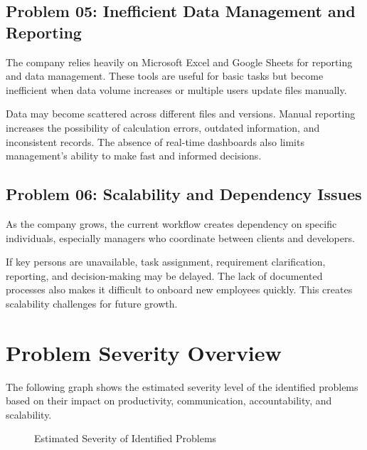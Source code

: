 \documentclass[12pt,a4paper]{report}
\begin{document}
\subsection{Problem 05: Inefficient Data Management and Reporting}

\begin{problemBox}
The company relies heavily on Microsoft Excel and Google Sheets for reporting and data management. These tools are useful for basic tasks but become inefficient when data volume increases or multiple users update files manually.
\end{problemBox}

Data may become scattered across different files and versions. Manual reporting increases the possibility of calculation errors, outdated information, and inconsistent records. The absence of real-time dashboards also limits management’s ability to make fast and informed decisions.

\subsection{Problem 06: Scalability and Dependency Issues}

\begin{problemBox}
As the company grows, the current workflow creates dependency on specific individuals, especially managers who coordinate between clients and developers.
\end{problemBox}

If key persons are unavailable, task assignment, requirement clarification, reporting, and decision-making may be delayed. The lack of documented processes also makes it difficult to onboard new employees quickly. This creates scalability challenges for future growth.

\section{Problem Severity Overview}

The following graph shows the estimated severity level of the identified problems based on their impact on productivity, communication, accountability, and scalability.

\begin{figure}[H]
\centering
{}
\caption{Estimated Severity of Identified Problems}
\end{figure}
\end{document}
